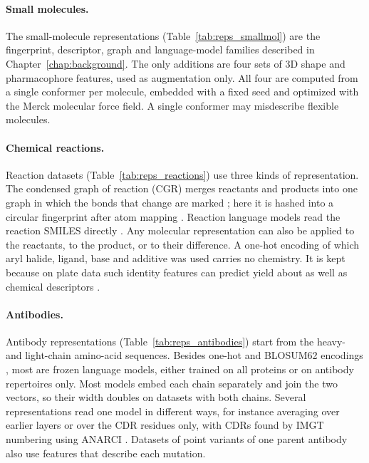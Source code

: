 \paragraph{Small molecules.} The small-molecule representations (Table~\ref{tab:reps_smallmol}) are the fingerprint, descriptor, graph and language-model families described in Chapter~\ref{chap:background}. The only additions are four sets of 3D shape and pharmacophore features, used as augmentation only. All four are computed from a single conformer per molecule, embedded with a fixed seed and optimized with the Merck molecular force field. A single conformer may misdescribe flexible molecules.

\paragraph{Chemical reactions.} Reaction datasets (Table~\ref{tab:reps_reactions}) use three kinds of representation. The condensed graph of reaction (CGR) merges reactants and products into one graph in which the bonds that change are marked \citep{Varnek2005, Hoonakker2011}; here it is hashed into a circular fingerprint after atom mapping \citep{Schwaller2021rxnmapper}. Reaction language models read the reaction SMILES directly \citep{Schwaller2021rxnfp, Sagawa2023ReactionT5}. Any molecular representation can also be applied to the reactants, to the product, or to their difference. A one-hot encoding of which aryl halide, ligand, base and additive was used carries no chemistry. It is kept because on plate data such identity features can predict yield about as well as chemical descriptors \citep{Chuang2018}.

\paragraph{Antibodies.} Antibody representations (Table~\ref{tab:reps_antibodies}) start from the heavy- and light-chain amino-acid sequences. Besides one-hot and BLOSUM62 encodings \citep{Henikoff1992}, most are frozen language models, either trained on all proteins or on antibody repertoires only. Most models embed each chain separately and join the two vectors, so their width doubles on datasets with both chains. Several representations read one model in different ways, for instance averaging over earlier layers or over the CDR residues only, with CDRs found by IMGT numbering \citep{Lefranc2003} using ANARCI \citep{Dunbar2016ANARCI}. Datasets of point variants of one parent antibody also use features that describe each mutation.

